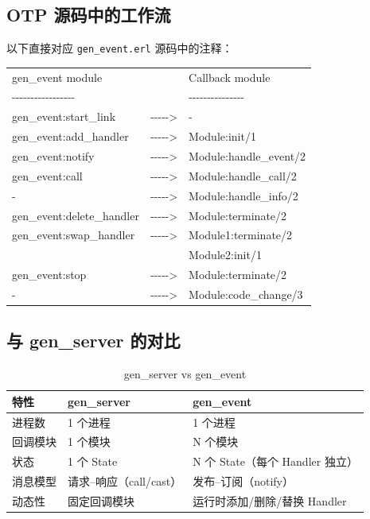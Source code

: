 \documentclass[a4paper,11pt]{article}
\begin{document}
\subsection{OTP 源码中的工作流}

以下直接对应 \texttt{gen\_event.erl} 源码中的注释：

\begin{tcolorbox}[colback=codebg, colframe=codeborder, arc=2mm, boxrule=0.5pt,
                  title={\textbf{gen\_event.erl --- Work Flow}},
                  fonttitle=\bfseries\ttfamily, width=\textwidth]
\small\ttfamily
\begin{tabular}{@{}lcl@{}}
gen\_event module &  & Callback module \\
\textsf{-{}-{}-{}-{}-{}-{}-{}-{}-{}-{}-{}-{}-{}-{}-{}-{}-} & & \textsf{-{}-{}-{}-{}-{}-{}-{}-{}-{}-{}-{}-{}-{}-{}-} \\
gen\_event:start\_link  & -{}-{}-{}-{}-> & - \\
gen\_event:add\_handler & -{}-{}-{}-{}-> & Module:init/1 \\
gen\_event:notify       & -{}-{}-{}-{}-> & Module:handle\_event/2 \\
gen\_event:call         & -{}-{}-{}-{}-> & Module:handle\_call/2 \\
-                      & -{}-{}-{}-{}-> & Module:handle\_info/2 \\
gen\_event:delete\_handler & -{}-{}-{}-{}-> & Module:terminate/2 \\
gen\_event:swap\_handler   & -{}-{}-{}-{}-> & Module1:terminate/2 \\
                          &               & Module2:init/1 \\
gen\_event:stop         & -{}-{}-{}-{}-> & Module:terminate/2 \\
-                      & -{}-{}-{}-{}-> & Module:code\_change/3 \\
\end{tabular}
\end{tcolorbox}

\subsection{与 gen\_server 的对比}

\begin{table}[H]
\centering
\begin{tabular}{@{}lll@{}}
\toprule
\textbf{特性} & \textbf{gen\_server} & \textbf{gen\_event} \\
\midrule
进程数       & 1 个进程           & 1 个进程 \\
回调模块     & 1 个模块           & N 个模块 \\
状态         & 1 个 State         & N 个 State（每个 Handler 独立） \\
消息模型     & 请求--响应（call/cast） & 发布--订阅（notify） \\
动态性       & 固定回调模块       & 运行时添加/删除/替换 Handler \\
\bottomrule
\end{tabular}
\caption{gen\_server vs gen\_event}
\end{table}
\end{document}
